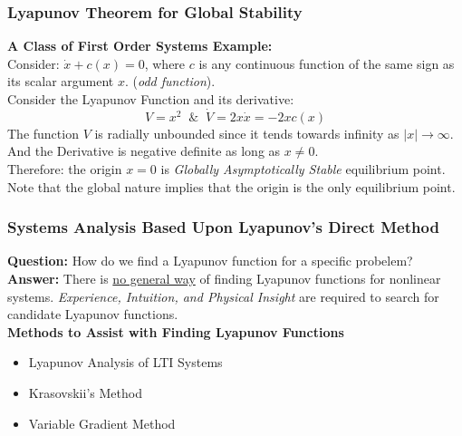 \documentclass[11pt,handout]{beamer}   %
\begin{document}
\begin{frame}
\frametitle{Lyapunov Theorem for Global Stability}
\textbf{A Class of First Order Systems Example:}\\
Consider: $\dot{x} + c(x) = 0$, where $c$ is any continuous function of the same sign as its scalar argument $x$. (\textit{odd function}).\\
\vspace{6pt}
Consider the Lyapunov Function and its derivative:
\begin{equation*}
V = x^2 \;\; \& \;\; \dot{V} = 2 x \dot{x} = -2xc(x)
\end{equation*}
The function $V$ is radially unbounded since it tends towards infinity as $|x| \rightarrow \infty$. And the Derivative is negative definite as long as $x \neq 0$.\\
\vspace{6pt}
Therefore: the origin $x=0$ is \textit{Globally Asymptotically Stable} equilibrium point.\\
Note that the global nature implies that the origin is the only equilibrium point.
\end{frame}

\begin{frame}
\frametitle{Systems Analysis Based Upon Lyapunov's Direct  Method}
\textbf{Question:} How do we find a Lyapunov function for a specific probelem?\\
\textbf{Answer:} There is \underline{no general way} of finding Lyapunov functions for nonlinear systems. \textit{Experience, Intuition, and Physical Insight} are required to search for candidate Lyapunov functions.\\
\vspace{6pt}
\textbf{Methods to Assist with Finding Lyapunov Functions}
\begin{itemize}
\item Lyapunov Analysis of LTI Systems
\item Krasovskii's Method
\item Variable Gradient Method
\end{itemize}
\end{frame}
\end{document}
